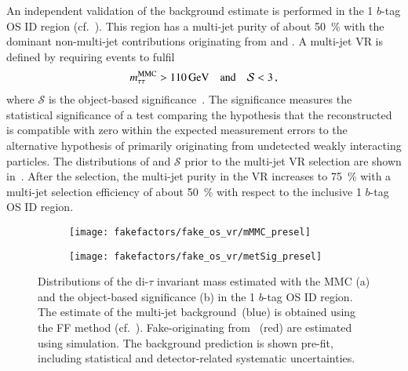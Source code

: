An independent validation of the background estimate is performed in the 1
$b$-tag OS ID region (cf.\ ). This region has a
multi-jet purity of about \SI{50}{\percent} with the dominant non-multi-jet
contributions originating from \Zjets and \ttbar. A multi-jet VR is defined by
requiring events to fulfil
\begin{align*}
  m_{\tau\tau}^\text{MMC} > \SI{110}{\ensuremath{\text{GeV}}} \quad \text{and} \quad \mathcal{S} < 3 \,\text{,}
\end{align*}
where $\mathcal{S}$ is the object-based \pTmissAbs
significance~\cite{ATLAS-CONF-2018-038}. The \pTmissAbs significance measures
the statistical significance of a test comparing the hypothesis that the
reconstructed \pTmissAbs is compatible with zero within the expected measurement
errors to the alternative hypothesis of \pTmissAbs primarily originating from
undetected weakly interacting particles. The distributions of \mMMC and
$\mathcal{S}$ prior to the multi-jet VR selection are shown
in~. After the selection, the multi-jet
purity in the VR increases to \SI{75}{\percent} with a multi-jet selection
efficiency of about \SI{50}{\percent} with respect to the inclusive 1 $b$-tag OS
ID region.


\begin{figure}[htbp]
  \centering

  \begin{subfigure}{0.44\textwidth}
    \texttt{[image: fakefactors/fake\_os\_vr/mMMC\_presel]}
    \subcaption{}
  \end{subfigure}\hspace*{0.04\textwidth}%
  \begin{subfigure}{0.44\textwidth}
    \texttt{[image: fakefactors/fake\_os\_vr/metSig\_presel]}
    \subcaption{}
  \end{subfigure}

  \caption[Distributions of \mMMC and the object-based \pTmissAbs significance
  in the 1 $b$-tag OS ID region.]{Distributions of the di-$\tau$ invariant mass
    estimated with the MMC (a) and the object-based \pTmissAbs significance (b)
    in the 1 $b$-tag OS ID region. The estimate of the multi-jet
    background~(blue) is obtained using the FF method
    (cf.~). Fake-\tauhadvis originating from
    \ttbar~(red) are estimated using simulation. The background prediction is
    shown pre-fit, including statistical and detector-related systematic
    uncertainties.}%
  \label{fig:fake_factor_OSVR_cutvars}
\end{figure}

